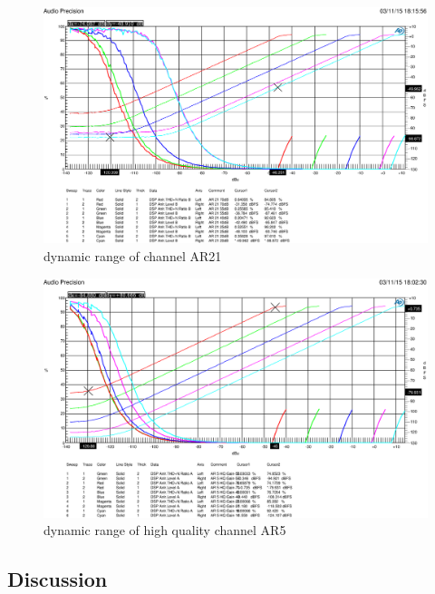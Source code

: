 \documentclass[11pt]{report}
\begin{document}
\begin{figure}[htbp]
\begin{center}
\includegraphics[width=14cm,keepaspectratio=true]{THDAR21dBVergleich}
\caption{dynamic range of channel AR21}
\label{fig:adthd}
\end{center}
\end{figure}

\begin{figure}[htbp]
\begin{center}
\includegraphics[width=14cm,keepaspectratio=true]{THDAR5HQdBVergleich}
\caption{dynamic range of high quality channel AR5}
\label{fig:adhqthd}
\end{center}
\end{figure}

	\subsection{Discussion}

\end{document}
